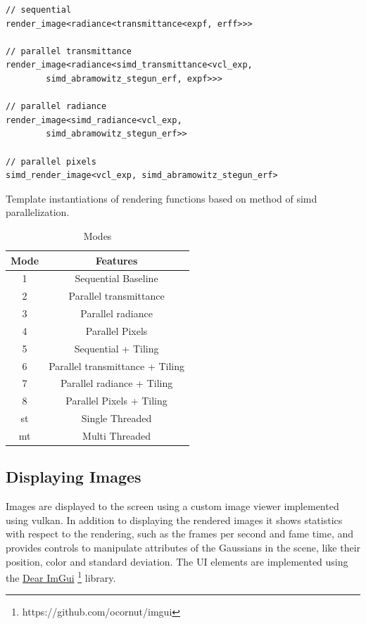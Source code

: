 \documentclass[a4paper, 11pt]{memoir}
\begin{document}
    \begin{listing}[t]
        \begin{verbatim}
// sequential
render_image<radiance<transmittance<expf, erff>>>

// parallel transmittance
render_image<radiance<simd_transmittance<vcl_exp,
        simd_abramowitz_stegun_erf, expf>>>

// parallel radiance
render_image<simd_radiance<vcl_exp,
        simd_abramowitz_stegun_erf>>

// parallel pixels
simd_render_image<vcl_exp, simd_abramowitz_stegun_erf>
        \end{verbatim}
        \caption{Template instantiations of rendering functions based on method of \gls{simd} parallelization.}
        \label{lst:template_inst}
    \end{listing}

    \begin{table}[b]
        \centering
        \begin{tabular}{|c|c|}
            \hline
            Mode & Features\\\hline
            1    & Sequential Baseline\\
            2    & Parallel \gls{transmittance}\\
            3    & Parallel \gls{radiance}\\
            4    & Parallel Pixels\\
            5    & Sequential + Tiling\\
            6    & Parallel \gls{transmittance} + Tiling\\
            7    & Parallel \gls{radiance} + Tiling\\
            8    & Parallel Pixels + Tiling\\
            st   & Single Threaded\\
            mt   & Multi Threaded\\
            \hline
        \end{tabular}
        \caption{Modes}
        \label{tab:exec_modes}
    \end{table}

    \subsection{Displaying Images}
    \label{sec:displaying_images}

    Images are displayed to the screen using a custom image viewer implemented using vulkan. In addition to displaying
    the rendered images it shows statistics with respect to the rendering, such as the frames per second and fame time,
    and provides controls to manipulate attributes of the Gaussians in the scene, like their position, color and standard
    deviation.
    The UI elements are implemented using the \href{https://github.com/ocornut/imgui}{Dear ImGui}
    \footnote{https://github.com/ocornut/imgui} library.
    
\end{document}
